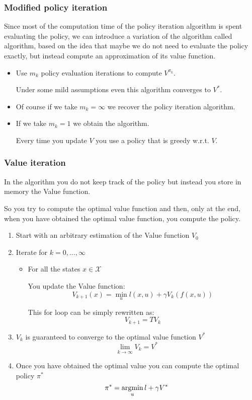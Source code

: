 \subsubsection{Modified policy iteration}
Since most of the computation time of the policy iteration algorithm is spent evaluating the policy, we can introduce a variation of the algorithm called  algorithm, based on the idea that maybe we do not need to evaluate the policy exactly, but instead compute an approximation of its value function.
\begin{itemize}
\item Use $m_k$ policy evaluation iterations to compute $V^{\pi_k}$.

Under some mild assumptions even this algorithm converges to $V^*$.
\item Of course if we take $m_k = \infty$ we recover the policy iteration algorithm.
\item If we take $m_k = 1$ we obtain the  algorithm.

Every time you update $V$ you use a policy that is greedy w.r.t. $V$.
\end{itemize}

\subsubsection{Value iteration}
In the  algorithm you do not keep track of the policy but instead you store in memory the Value function.

So you try to compute the optimal value function and then, only at the end, when you have obtained the optimal value function, you compute the policy.
\begin{enumerate}
\item Start with an arbitrary estimation of the Value function $V_0$
\item Iterate for $k = 0,...,\infty$
\begin{itemize}
\item For all the states $x\in\mathcal{X}$ 

You update the Value function:
\[V_{k+1}(x) = \min_u l(x,u) + \gamma V_k(f(x,u))\]

This for loop can be simply rewritten as:
\[V_{k+1} = TV_k\]
\end{itemize}
\item $V_k$ is guaranteed to converge to the optimal value function $V^*$
\[\lim_{k\to\infty} V_k = V^*\]
\item Once you have obtained the optimal value you can compute the optimal policy $\pi^*$
\[\pi^* = \operatorname*{argmin}_u l + \gamma V^*\]
\end{enumerate}


